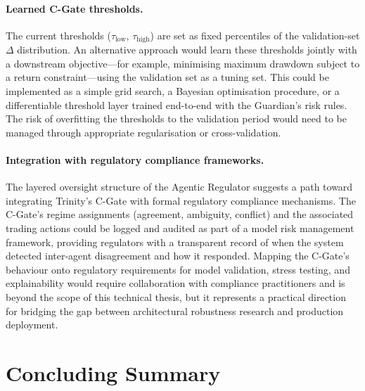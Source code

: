 \paragraph{Learned C-Gate thresholds.}
The current thresholds ($\tau_{\text{low}}$, $\tau_{\text{high}}$) are set
as fixed percentiles of the validation-set $\Delta$ distribution. An
alternative approach would learn these thresholds jointly with a downstream
objective---for example, minimising maximum drawdown subject to a return
constraint---using the validation set as a tuning set. This could be
implemented as a simple grid search, a Bayesian optimisation procedure, or
a differentiable threshold layer trained end-to-end with the Guardian's
risk rules. The risk of overfitting the thresholds to the validation period
would need to be managed through appropriate regularisation or
cross-validation.

\paragraph{Integration with regulatory compliance frameworks.}
The layered oversight structure of the Agentic Regulator
\cite{kurshan_agentic_2025} suggests a path toward integrating Trinity's
C-Gate with formal regulatory compliance mechanisms. The C-Gate's regime
assignments (agreement, ambiguity, conflict) and the associated trading
actions could be logged and audited as part of a model risk management
framework, providing regulators with a transparent record of when the system
detected inter-agent disagreement and how it responded. Mapping the C-Gate's
behaviour onto regulatory requirements for model validation, stress testing,
and explainability would require collaboration with compliance practitioners
and is beyond the scope of this technical thesis, but it represents a
practical direction for bridging the gap between architectural robustness
research and production deployment.

\section{Concluding Summary}
\label{sec:disc-concluding}

